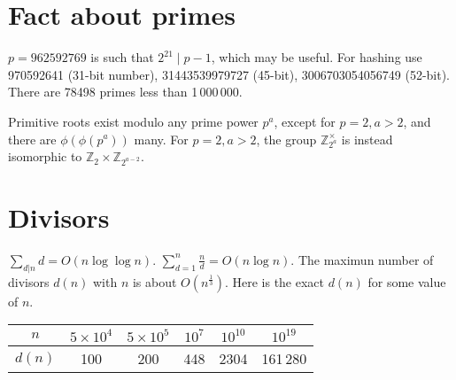 \section{Fact about primes}
	$p=962592769$ is such that $2^{21} \mid p-1$, which may be useful. For hashing
	use 970592641 (31-bit number), 31443539979727 (45-bit), 3006703054056749
	(52-bit). There are 78498 primes less than 1\,000\,000.

	Primitive roots exist modulo any prime power $p^a$, except for $p = 2, a > 2$, and there are $\phi(\phi(p^a))$ many.
	For $p = 2, a > 2$, the group $\mathbb Z_{2^a}^\times$ is instead isomorphic to $\mathbb Z_2 \times \mathbb Z_{2^{a-2}}$.

\section{Divisors}
	$\sum_{d|n} d = O(n \log \log n)$.
    $\sum_{d = 1} ^ {n} \frac{n}{d} = O(n \log n)$.
    The maximun number of divisors $d(n)$ with $n$ is about $O(n^{\frac{1}{3}})$. Here is the exact $d(n)$ for some value of $n$.
    \begin{tabular}{|c|c|c|c|c|c|}
        \hline
        $n$    & $5 \times 10^4$  & $5 \times 10^5$ & $10^7$ & $10^{10}$ & $10^{19}$  \\ \hline
        $d(n)$ & 100              & 200             & 448    & 2304   & 161\,280 \\ \hline
    \end{tabular}

